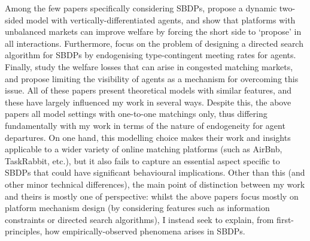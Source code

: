 Among the few papers specifically considering SBDPs, \cite{kanoria2021facilitating} propose a dynamic two-sided model with vertically-differentiated agents, and show that platforms with unbalanced markets can improve welfare by forcing the short side to `propose' in all interactions. 
Furthermore, \cite{immorlica2021designing} focus on the problem of designing a directed search algorithm for SBDPs by endogenising type-contingent meeting rates for agents. 
Finally, \cite{arnosti2021managing} study the welfare losses that can arise in congested matching markets, and propose limiting the visibility of agents as a mechanism for overcoming this issue.
All of these papers present theoretical models with similar features, and these have largely influenced my work in several ways. 
Despite this, the above papers all model settings with one-to-one matchings only, thus differing fundamentally with my work in terms of the nature of endogeneity for agent departures. 
On one hand, this modelling choice makes their work and insights applicable to a wider variety of online matching platforms (such as AirBnb, TaskRabbit, etc.), but it also fails to capture an essential aspect specific to SBDPs that could have significant behavioural implications. 
Other than this (and other minor technical differences), the main point of distinction between my work and theirs is mostly one of perspective: whilst the above papers focus mostly on  platform mechanism design (by considering features such as information constraints or directed search algorithms), I instead seek to explain, from first-principles, how empirically-observed phenomena arises in SBDPs.